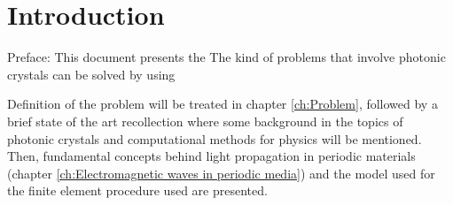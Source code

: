 \chapter{Introduction}

Preface:
This document presents the 
The kind of problems that involve photonic crystals can be solved by using 

Definition of the problem will be treated in chapter \ref{ch:Problem}, followed by a brief state of the art recollection where some background in the topics of photonic crystals and computational methods for physics will be mentioned. Then, fundamental concepts behind light propagation in periodic materials (chapter \ref{ch:Electromagnetic waves in periodic media})  and the model used for the finite element procedure used are presented.